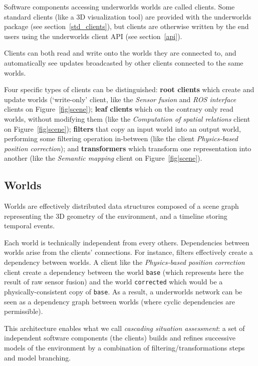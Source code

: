 \documentclass[letterpaper, 10 pt, conference]{ieeeconf}  %
\newcommand{\uwds}{{\sc underworlds}\xspace}
\begin{document}
Software components accessing \uwds worlds are called clients. Some standard
clients (like a 3D visualization tool) are provided with the \uwds package (see
section~\ref{std_clients}), but clients are otherwise written by the end users
using the \uwds client API (see section~\ref{api}).

Clients can both read and write onto the worlds they are connected to, and
automatically see updates broadcasted by other clients connected to the same
worlds.

Four specific types of clients can be distinguished: \textbf{root clients} which
create and update worlds (`write-only' client, like the \emph{Sensor fusion} and
\emph{ROS interface} clients on Figure~\ref{fig|scene}); \textbf{leaf clients}
which on the contrary only read worlds, without modifying them (like the
\emph{Computation of spatial relations} client on Figure~\ref{fig|scene});
\textbf{filters} that copy an input world into an output world, performing
some filtering operation in-between (like the client \textit{Physics-based
position correction}); and \textbf{transformers} which transform one
representation into another (like the \emph{Semantic mapping} client on
Figure~\ref{fig|scene}).

\subsection{Worlds}

Worlds are effectively distributed data structures composed of a scene graph
representing the 3D geometry of the environment, and a timeline storing temporal
events.

Each world is technically independent from every others. Dependencies between
worlds arise from the clients' connections. For instance, filters effectively
create a dependency between worlds. A client like the \textit{Physics-based
position correction} client create a dependency between the world {\tt base} (which
represents here the result of raw sensor fusion) and the world {\tt corrected}
which would be a physically-consistent copy of {\tt base}.
As a result, a \uwds network can be seen as a dependency graph between worlds (where
cyclic dependencies are permissible).

This architecture enables what we call \emph{cascading situation assessment}:
a set of independent software components (the clients) builds and refines
successive models of the environment by a combination of
filtering/transformations steps and model branching.
\end{document}
